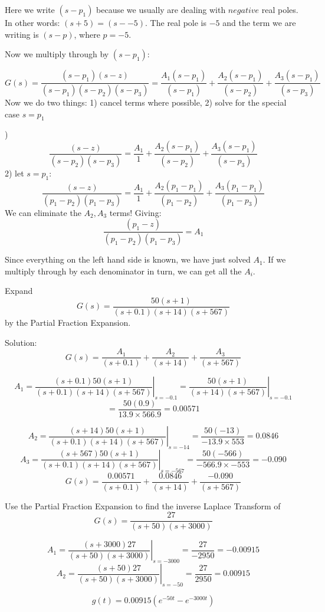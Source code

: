 Here we write $(s-p_1)$ because we usually are dealing with $negative$ real poles.   In other words: $(s+5) = (s - -5)$.   The real pole is $-5$ and the 
term we are writing is $(s-p)$, where $p=-5$.

Now we multiply through by $(s-p_1)$:

\[
G(s) = \frac  {(s-p_1)(s-z)}   {(s-p_1)(s-p_2)(s-p_3)} =  \frac{A_1(s-p_1)}{(s-p_1)}+\frac{A_2(s-p_1)}{(s-p_2)}+\frac{A_3(s-p_1)}{(s-p_3)}
\]
Now we do two things:  1) cancel terms where possible,  2) solve for the special case $s=p_1$

)
\[
\frac  {(s-z)}   {(s-p_2)(s-p_3)} =  \frac{A_1}{1}+\frac{A_2(s-p_1)}{(s-p_2)}+\frac{A_3(s-p_1)}{(s-p_3)}
\]
2)
let $s=p_1$:
\[
\frac  {(s-z)}   {(p_1-p_2)(p_1-p_3)} =  \frac{A_1}{1}+\frac{A_2(p_1-p_1)}{(p_1-p_2)}+\frac{A_3(p_1-p_1)}{(p_1-p_3)}
\]
We can eliminate the $A_2,A_3$ terms! Giving: 
\[
\frac  {(p_1-z)}   {(p_1-p_2)(p_1-p_3)} =  {A_1}
\]

Since everything on the left hand side is known, 
we have just solved $A_1$.    If we multiply through by each denominator in turn, we can get all the $A_i$.




\begin{ExampleSmall}
Expand
\[
G(s) = \frac         {50(s+1)}                      {(s+0.1)(s+14)(s+567)}
\]
by the Partial Fraction Expansion.

\vspace{0.2in}
Solution:
\[
G(s) = \frac{A_1}{(s+0.1)} + \frac{A_2}{(s+14)} + \frac{A_3}{(s+567)}
\]

\[
A_1 = \left . \frac {(s+0.1)50(s+1)}{(s+0.1)(s+14)(s+567)} \right |_{s=-0.1} = \left . \frac {50(s+1)}  {(s+14)(s+567)}\right |_{s=-0.1}
\]
\[
= \frac {50(0.9)}{13.9\times566.9} = 0.00571
\]

\[
A_2 = \left . \frac {(s+14)50(s+1)}{(s+0.1)(s+14)(s+567)} \right |_{s=-14} = \frac {50(-13)}{-13.9 \times 553} = 0.0846
\]
\[
A_3 = \left . \frac {(s+567)50(s+1)}{(s+0.1)(s+14)(s+567)} \right |_{s=-567} = \frac {50(-566)}{-566.9 \times -553} = -0.090
\]
\vspace{0.15in}
\[
G(s) = \frac{0.00571}{(s+0.1)} + \frac{0.0846}{(s+14)} + \frac{-0.090}{(s+567)}
\]
\end{ExampleSmall}

\begin{ExampleSmall}
Use the Partial Fraction Expansion to find the inverse Laplace Transform of
\[
G(s) =  \frac          {27}             {(s+50)(s+3000)}
\]


\[
A_1 = \left . \frac {(s+3000)27}{(s+50)(s+3000)} \right |_{s=-3000} = \frac {27}{-2950} = -0.00915
\]
\[
A_2 = \left . \frac {(s+50)27}{(s+50)(s+3000)} \right |_{s=-50} = \frac {27}{2950} = 0.00915
\]

\[
g(t) = 0.00915(e^{-50t}-e^{-3000t})
\]

\end{ExampleSmall}


